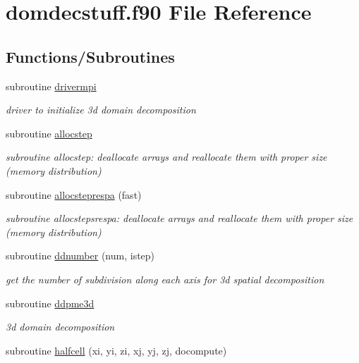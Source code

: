 \hypertarget{domdecstuff_8f90}{\section{domdecstuff.\-f90 File Reference}
\label{domdecstuff_8f90}
}
\subsection*{Functions/\-Subroutines}
\begin{DoxyCompactItemize}
\item 
subroutine \hyperlink{domdecstuff_8f90_a6ffc4a7b5c0a99afa65d7da532bf610d}{drivermpi}
\begin{DoxyCompactList}\small\item\em driver to initialize 3d domain decomposition \end{DoxyCompactList}\item 
subroutine \hyperlink{domdecstuff_8f90_ad0ae22cce4cf8e637999746588be7c17}{allocstep}
\begin{DoxyCompactList}\small\item\em subroutine allocstep\-: deallocate arrays and reallocate them with proper size (memory distribution) \end{DoxyCompactList}\item 
subroutine \hyperlink{domdecstuff_8f90_af44472a279ad05de93d1100779b57c43}{allocsteprespa} (fast)
\begin{DoxyCompactList}\small\item\em subroutine allocstepsrespa\-: deallocate arrays and reallocate them with proper size (memory distribution) \end{DoxyCompactList}\item 
subroutine \hyperlink{domdecstuff_8f90_a292e801ea699d1f460f0b64391ce4a91}{ddnumber} (num, istep)
\begin{DoxyCompactList}\small\item\em get the number of subdivision along each axis for 3d spatial decomposition \end{DoxyCompactList}\item 
subroutine \hyperlink{domdecstuff_8f90_a0e8cba98e7c282a05eae1741d9d752fc}{ddpme3d}
\begin{DoxyCompactList}\small\item\em 3d domain decomposition \end{DoxyCompactList}\item 
subroutine \hyperlink{domdecstuff_8f90_ad84d76d62fd57e48e82cd729578a92e9}{halfcell} (xi, yi, zi, xj, yj, zj, docompute)

\end{DoxyCompactItemize}
